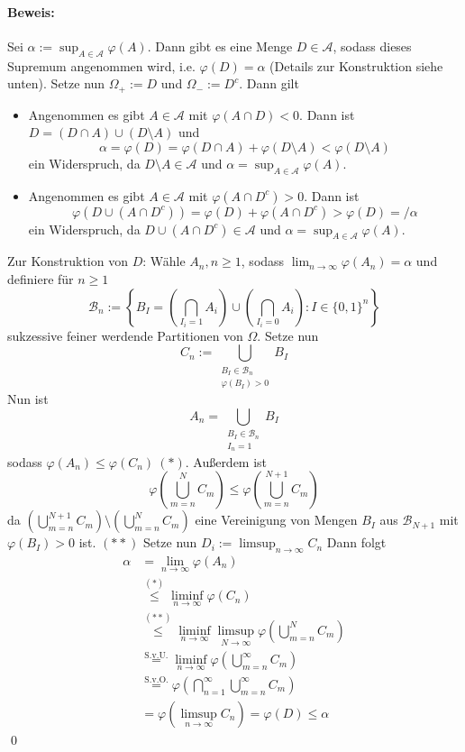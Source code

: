 \documentclass[11pt]{report}
\begin{document}
     \paragraph{Beweis:}Sei $\alpha:=\displaystyle\sup_{A\in\mathcal{A}}\varphi(A)$. Dann gibt es eine Menge $D\in\mathcal{A}$, sodass dieses Supremum angenommen wird, i.e. $\varphi(D)=\alpha$ (Details zur Konstruktion siehe unten).
     Setze nun $\Omega_+:=D$ und $\Omega_-:=D^c$. Dann gilt
     \begin{itemize}
         \item Angenommen es gibt $A\in\mathcal{A}$ mit $\varphi(A\cap D)<0$. Dann ist $D=(D\cap A)\cup(D\setminus A)$ und 
         $$\alpha=\varphi(D)=\varphi(D\cap A)+\varphi(D\setminus A)<\varphi(D\setminus A)$$
         ein Widerspruch, da $D\setminus A\in\mathcal{A}$ und $\alpha=\displaystyle\sup_{A\in\mathcal{A}}\varphi(A)$.
         \item Angenommen es gibt $A\in\mathcal{A}$ mit $\varphi(A\cap D^c)>0$. Dann ist 
         $$\varphi(D\cup(A\cap D^c))=\varphi(D)+\varphi(A\cap D^c)>\varphi(D)=/\alpha$$
         ein Widerspruch, da $D\cup(A\cap D^c)\in\mathcal{A}$ und $\alpha=\displaystyle\sup_{A\in\mathcal{A}}\varphi(A)$.
     \end{itemize}
     Zur Konstruktion von $D$:\newline
     W\"ahle $A_n,n\geq1$, sodass $\displaystyle\lim_{n\to\infty}\varphi(A_n)=\alpha$ und definiere f\"ur $n\geq1$
     $$\mathcal{B}_n:=\left\{B_I=\left(\bigcap_{I_i=1}A_i\right)\cup\left(\bigcap_{I_i=0}A_i\right):I\in\{0,1\}^n\right\}$$
     sukzessive feiner werdende Partitionen von $\Omega$. Setze nun 
     $$C_n:=\bigcup_{\substack{B_I\in\mathcal{B}_n\\ \varphi(B_I)>0}}B_I$$
     Nun ist 
     $$A_n=\bigcup_{\substack{B_I\in\mathcal{B}_n\\ I_n=1}}B_I$$
     sodass $\varphi(A_n)\leq\varphi(C_n)\ (*)$. Au\ss{}erdem ist 
     $$\varphi\left(\bigcup_{m=n}^NC_m\right)\leq\varphi\left(\bigcup_{m=n}^{N+1}C_m\right)$$
     da $\displaystyle\left(\bigcup_{m=n}^{N+1}C_m\right)\setminus \left(\bigcup_{m=n}^NC_m\right)$ eine Vereinigung von Mengen $B_I$ aus $\mathcal{B}_{N+1}$ mit $\varphi(B_I)>0$ ist. $(**)$\newline\newline 
     Setze nun $D_i:=\displaystyle\limsup_{n\to\infty}C_n$
     Dann folgt
     \begin{align*}
         \alpha&=\lim_{n\to\infty}\varphi(A_n) \\
         &\overset{(*)}{\leq}\liminf_{n\to\infty}\varphi(C_n)\\
         &\overset{(**)}{\leq}\liminf_{n\to\infty}\limsup_{N\to\infty}\varphi\left(\bigcup_{m=n}^NC_m\right)\\
         &\overset{\text{S.v.U.}}{=}\liminf_{n\to\infty}\varphi\left(\bigcup_{m=n}^\infty C_m\right)\\
         &\overset{\text{S.v.O.}}{=}\varphi\left(\bigcap_{n=1}^\infty \bigcup_{m=n}^\infty C_m\right)\\
         &=\varphi\left(\limsup_{n\to\infty}C_n\right)=\varphi(D)\leq\alpha
     \end{align*}
     \qed
     
\end{document}
